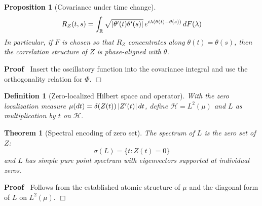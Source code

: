 \documentclass{article}
\newenvironment{proof}{\noindent\textbf{Proof\ }}{\hspace*{\fill}$\Box$\medskip}
\newtheorem{definition}{Definition}
\newtheorem{proposition}{Proposition}
{\theorembodyfont{\rmfamily}\newtheorem{remark}{Remark}}
\newtheorem{theorem}{Theorem}
\begin{document}
\begin{proposition}
  [Covariance under time change]
  \begin{equation}
    R_Z (t, s) = \int_{\mathbb{R}} \sqrt{| \theta' (t) \theta' (s) |} 
    \hspace{0.17em} e^{i \lambda (\theta (t) - \theta (s))}  \hspace{0.17em}
    dF (\lambda)
  \end{equation}
  In particular, if $F$ is chosen so that $R_Z$ concentrates along $\theta (t)
  = \theta (s)$, then the correlation structure of $Z$ is phase-aligned with
  $\theta$.
\end{proposition}

\begin{proof}
  Insert the oscillatory function into the covariance integral and use the
  orthogonality relation for $\Phi$.
\end{proof}

\begin{definition}
  [Zero-localized Hilbert space and operator] With the zero localization
  measure $\mu (dt) = \delta (Z (t)) \hspace{0.17em} |Z' (t) | 
  \hspace{0.17em} dt$, define $\mathcal{H}= L^2 (\mu)$ and $L$ as
  multiplication by $t$ on $\mathcal{H}$.
\end{definition}

\begin{theorem}
  [Spectral encoding of zero set] The spectrum of $L$ is the zero set of $Z$:
  \begin{equation}
    \sigma (L) = \{t : Z (t) = 0\}
  \end{equation}
  and $L$ has simple pure point spectrum with eigenvectors supported at
  individual zeros.
\end{theorem}

\begin{proof}
  Follows from the established atomic structure of $\mu$ and the diagonal form
  of $L$ on $L^2 (\mu)$.
\end{proof}
\end{document}
